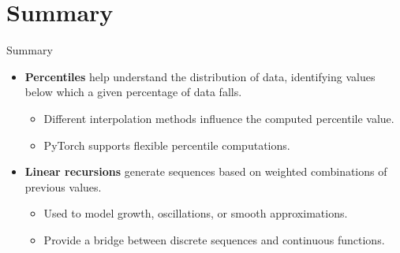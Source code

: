 \documentclass{beamer}
\begin{document}
\section*{Summary}
\begin{frame}{Summary}
\begin{itemize}
  \item \textbf{Percentiles} help understand the distribution of data, identifying values below which a given percentage of data falls.
  \begin{itemize}
    \item Different interpolation methods influence the computed percentile value.
    \item PyTorch supports flexible percentile computations.
  \end{itemize}
  \item \textbf{Linear recursions} generate sequences based on weighted combinations of previous values.
  \begin{itemize}
    \item Used to model growth, oscillations, or smooth approximations.
    \item Provide a bridge between discrete sequences and continuous functions.
  \end{itemize}
\end{itemize}
\end{frame}
\end{document}
